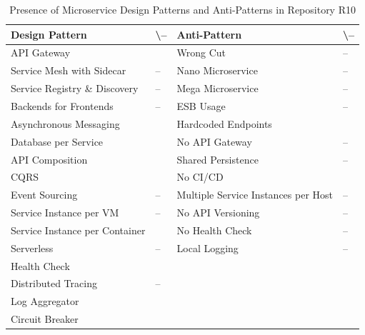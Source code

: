 \documentclass{Configuration_Files/PoliMi3i_thesis}
\newcommand{\cmark}{\ding{51}}%
\begin{document}
\begin{table}[H]
\centering 
    \begin{tabular}{ 
  | >{\centering\arraybackslash} m{16em} 
  | >{\centering\arraybackslash} m{2.2em} 
  | >{\centering\arraybackslash} m{16em} 
  | >{\centering\arraybackslash} m{2.2em} | }
    \hline
    \rowcolor{bluepoli!40}
    \textbf{Design Pattern} & \cmark \textbackslash – & \textbf{Anti-Pattern} & \cmark \textbackslash – \T\B \\
    \hline \hline
    API Gateway & \cmark & Wrong Cut & – \T\B\\
    \hline
    \rowcolor{bluepoli!10}
    Service Mesh with Sidecar & – & Nano Microservice & – \T\B \\
    \hline
    Service Registry \& Discovery & – & Mega Microservice & – \T\B \\
    \hline
    \rowcolor{bluepoli!10}
    Backends for Frontends & – & ESB Usage & – \T\B \\
    \hline
    Asynchronous Messaging & \cmark & Hardcoded Endpoints & \cmark \T\B \\
    \hline
    \rowcolor{bluepoli!10}
    Database per Service & \cmark & No API Gateway & – \T\B \\
    \hline
    API Composition & \cmark & Shared Persistence & – \T\B \\
    \hline
    \rowcolor{bluepoli!10}
    CQRS & \cmark & No CI/CD & \cmark \T\B \\
    \hline
    Event Sourcing & – & Multiple Service Instances per Host & – \T\B \\
    \hline
    \rowcolor{bluepoli!10}
    Service Instance per VM & – & No API Versioning & – \T\B \\
    \hline
    Service Instance per Container & \cmark & No Health Check & – \T\B \\
    \hline
    \rowcolor{bluepoli!10}
    Serverless & – & Local Logging & – \T\B \\
    \hline
    Health Check & \cmark &  & \T\B \\
    \hline
    \rowcolor{bluepoli!10}
    Distributed Tracing & – & & \T\B \\
    \hline
    Log Aggregator & \cmark &  & \T\B \\
    \hline
    \rowcolor{bluepoli!10}
    Circuit Breaker & \cmark &  & \T\B \\
    \hline
    \end{tabular}
    \\[10pt]
    \caption{Presence of Microservice Design Patterns and Anti-Patterns in Repository R10}
    \label{table:R10_result}
\end{table}
\end{document}
